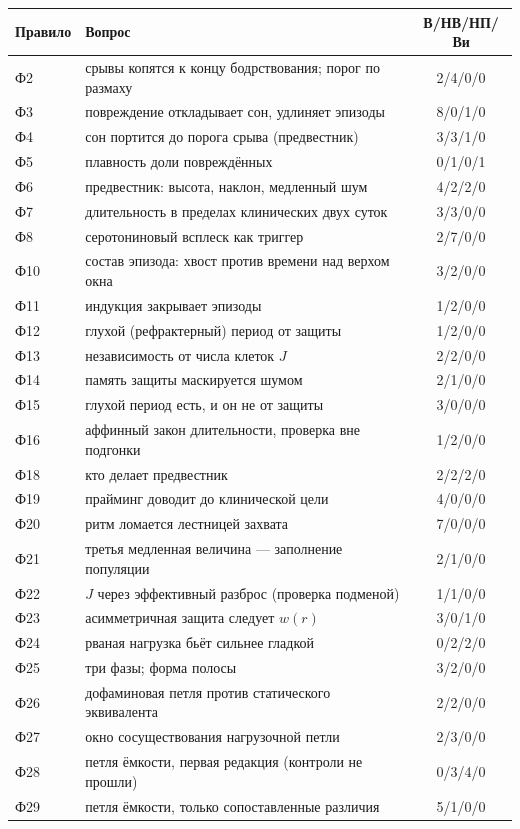 \documentclass[11pt,a4paper]{article}
\theoremstyle{remark}
\begin{document}
\begin{center}\footnotesize
\begin{tabular}{@{}l p{} c@{}}
\toprule
Правило & Вопрос & В/НВ/НП/Ви\\
\midrule
Ф2 & срывы копятся к концу бодрствования; порог по размаху & 2/4/0/0\\
Ф3 & повреждение откладывает сон, удлиняет эпизоды & 8/0/1/0\\
Ф4 & сон портится до порога срыва (предвестник) & 3/3/1/0\\
Ф5 & плавность доли повреждённых & 0/1/0/1\\
Ф6 & предвестник: высота, наклон, медленный шум & 4/2/2/0\\
Ф7 & длительность в пределах клинических двух суток & 3/3/0/0\\
Ф8 & серотониновый всплеск как триггер & 2/7/0/0\\
Ф10 & состав эпизода: хвост против времени над верхом окна & 3/2/0/0\\
Ф11 & индукция закрывает эпизоды & 1/2/0/0\\
Ф12 & глухой (рефрактерный) период от защиты & 1/2/0/0\\
Ф13 & независимость от числа клеток $J$ & 2/2/0/0\\
Ф14 & память защиты маскируется шумом & 2/1/0/0\\
Ф15 & глухой период есть, и он не от защиты & 3/0/0/0\\
Ф16 & аффинный закон длительности, проверка вне подгонки & 1/2/0/0\\
Ф18 & кто делает предвестник & 2/2/2/0\\
Ф19 & прайминг доводит до клинической цели & 4/0/0/0\\
Ф20 & ритм ломается лестницей захвата & 7/0/0/0\\
Ф21 & третья медленная величина --- заполнение популяции & 2/1/0/0\\
Ф22 & $J$ через эффективный разброс (проверка подменой) & 1/1/0/0\\
Ф23 & асимметричная защита следует $w(r)$ & 3/0/1/0\\
Ф24 & рваная нагрузка бьёт сильнее гладкой & 0/2/2/0\\
Ф25 & три фазы; форма полосы & 3/2/0/0\\
Ф26 & дофаминовая петля против статического эквивалента & 2/2/0/0\\
Ф27 & окно сосуществования нагрузочной петли & 2/3/0/0\\
Ф28 & петля ёмкости, первая редакция (контроли не прошли) & 0/3/4/0\\
Ф29 & петля ёмкости, только сопоставленные различия & 5/1/0/0\\
\bottomrule
\end{tabular}
\end{center}
\end{document}
